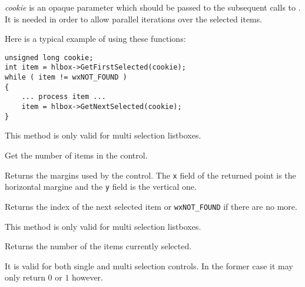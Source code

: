{\it cookie} is an opaque parameter which should be passed to the subsequent
calls to . It is needed in
order to allow parallel iterations over the selected items.

Here is a typical example of using these functions:
\begin{verbatim}
unsigned long cookie;
int item = hlbox->GetFirstSelected(cookie);
while ( item != wxNOT_FOUND )
{
    ... process item ...
    item = hlbox->GetNextSelected(cookie);
}
\end{verbatim}

This method is only valid for multi selection listboxes.


\label{wxvlistboxgetitemcount}


Get the number of items in the control.




\label{wxvlistboxgetmargins}


Returns the margins used by the control. The {\tt x} field of the returned
point is the horizontal margine and the {\tt y} field is the vertical one.




\label{wxvlistboxgetnextselected}


Returns the index of the next selected item or {\tt wxNOT\_FOUND} if there are
no more.

This method is only valid for multi selection listboxes.




\label{wxvlistboxgetselectedcount}


Returns the number of the items currently selected.

It is valid for both single and multi selection controls. In the former case it
may only return $0$ or $1$ however.

